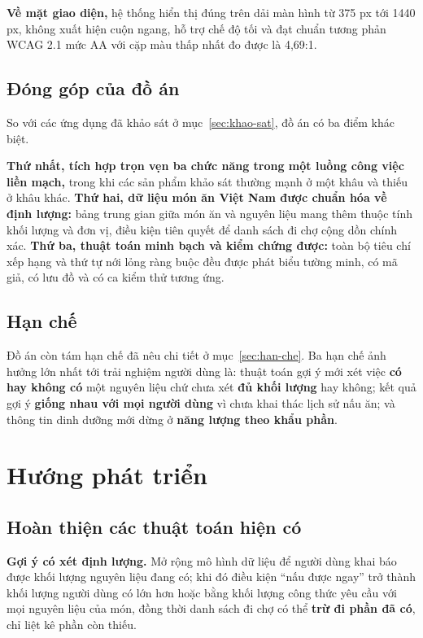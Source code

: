 \textbf{Về mặt giao diện,} hệ thống hiển thị đúng trên dải màn hình từ 375 px tới
1440 px, không xuất hiện cuộn ngang, hỗ trợ chế độ tối và đạt chuẩn tương phản
WCAG 2.1 mức AA với cặp màu thấp nhất đo được là 4,69:1.

\subsection{Đóng góp của đồ án}

So với các ứng dụng đã khảo sát ở mục~\ref{sec:khao-sat}, đồ án có ba điểm khác
biệt.

\textbf{Thứ nhất, tích hợp trọn vẹn ba chức năng trong một luồng công việc liền
mạch,} trong khi các sản phẩm khảo sát thường mạnh ở một khâu và thiếu ở khâu
khác. \textbf{Thứ hai, dữ liệu món ăn Việt Nam được chuẩn hóa về định lượng:}
bảng trung gian giữa món ăn và nguyên liệu mang thêm thuộc tính khối lượng và
đơn vị, điều kiện tiên quyết để danh sách đi chợ cộng dồn chính xác.
\textbf{Thứ ba, thuật toán minh bạch và kiểm chứng được:} toàn bộ tiêu chí xếp
hạng và thứ tự nới lỏng ràng buộc đều được phát biểu tường minh, có mã giả, có
lưu đồ và có ca kiểm thử tương ứng.

\subsection{Hạn chế}

Đồ án còn tám hạn chế đã nêu chi tiết ở mục~\ref{sec:han-che}. Ba hạn chế ảnh
hưởng lớn nhất tới trải nghiệm người dùng là: thuật toán gợi ý mới xét việc
\textbf{có hay không có} một nguyên liệu chứ chưa xét \textbf{đủ khối lượng} hay
không; kết quả gợi ý \textbf{giống nhau với mọi người dùng} vì chưa khai thác
lịch sử nấu ăn; và thông tin dinh dưỡng mới dừng ở \textbf{năng lượng theo khẩu
phần}.

\section{Hướng phát triển}

\subsection{Hoàn thiện các thuật toán hiện có}

\textbf{Gợi ý có xét định lượng.} Mở rộng mô hình dữ liệu để người dùng khai báo
được khối lượng nguyên liệu đang có; khi đó điều kiện ``nấu được ngay'' trở
thành khối lượng người dùng có lớn hơn hoặc bằng khối lượng công thức yêu cầu
với mọi nguyên liệu của món, đồng thời danh sách đi chợ có thể \textbf{trừ đi
phần đã có}, chỉ liệt kê phần còn thiếu.

